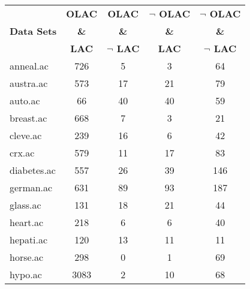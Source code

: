 \begin{table}[htbp]
	\centering
		\begin{tabular}{|l|c|c|c|c|}
		\hline
				& \textbf{OLAC}		& \textbf{OLAC}			& \textbf{$\neg$ OLAC}	& \textbf{$\neg$ OLAC}	\\
		\textbf{Data Sets}	& \textbf{\&}		& \textbf{\&}			& \textbf{\&}			& \textbf{\&}			\\
				& \textbf{LAC}		& \textbf{$\neg$ LAC}		& \textbf{LAC}			& \textbf{$\neg$ LAC}		\\
		\hline
		anneal.ac       & 726           & 5                  & 3                        & 64                            \\
		\hline
		austra.ac       & 573           & 17                 & 21                       & 79                            \\
		\hline
		auto.ac         & 66            & 40                 & 40                       & 59                            \\
		\hline
		breast.ac       & 668           & 7                  & 3                        & 21                            \\
		\hline
		cleve.ac        & 239           & 16                 & 6                        & 42                            \\
		\hline
		crx.ac          & 579           & 11                 & 17                       & 83                            \\
		\hline
		diabetes.ac     & 557           & 26                 & 39                       & 146                           \\
		\hline
		german.ac       & 631           & 89                 & 93                       & 187                           \\
		\hline
		glass.ac        & 131           & 18                 & 21                       & 44                            \\
		\hline
		heart.ac        & 218           & 6                  & 6                        & 40                            \\
		\hline
		hepati.ac       & 120           & 13                 & 11                       & 11                            \\
		\hline
		horse.ac        & 298           & 0                  & 1                        & 69                            \\
		\hline
		hypo.ac         & 3083          & 2                  & 10                       & 68                            \\

\end{tabular}
\end{table}
